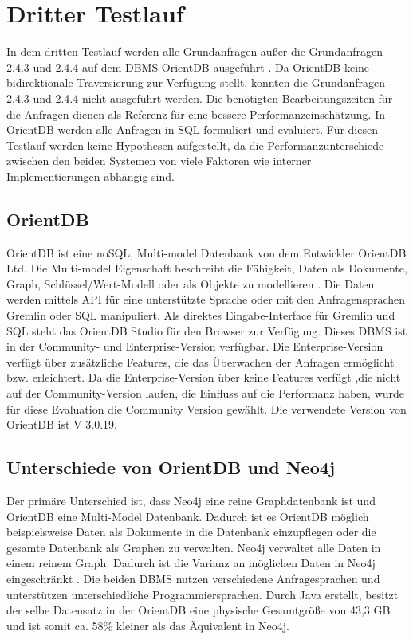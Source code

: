 \section{Dritter Testlauf}
In dem dritten Testlauf werden alle Grundanfragen außer die Grundanfragen 2.4.3 und 2.4.4 auf dem DBMS OrientDB ausgeführt \parencite{OrientDB}. Da OrientDB keine bidirektionale Traversierung zur Verfügung stellt, konnten die Grundanfragen 2.4.3 und 2.4.4 nicht ausgeführt werden. Die benötigten Bearbeitungszeiten für die Anfragen dienen als Referenz für eine bessere Performanzeinschätzung. In OrientDB werden alle Anfragen in SQL formuliert und evaluiert. Für diesen Testlauf werden keine Hypothesen aufgestellt, da die Performanzunterschiede zwischen den beiden Systemen von viele Faktoren wie interner Implementierungen abhängig sind. 
\subsection{OrientDB}
OrientDB ist eine noSQL,  Multi-model Datenbank von dem Entwickler OrientDB Ltd. Die Multi-model Eigenschaft beschreibt die Fähigkeit, Daten als Dokumente, Graph, Schlüssel/Wert-Modell oder als Objekte zu modellieren \parencite{OrientDB}. Die Daten werden mittels API für eine unterstützte Sprache oder mit den Anfragensprachen Gremlin oder SQL manipuliert. Als direktes Eingabe-Interface für Gremlin und SQL steht das OrientDB Studio für den Browser zur Verfügung.  Dieses DBMS ist in der Community- und Enterprise-Version verfügbar. Die Enterprise-Version verfügt über zusätzliche Features, die das Überwachen der Anfragen ermöglicht bzw. erleichtert. Da die Enterprise-Version über keine Features verfügt ,die nicht auf der Community-Version laufen, die Einfluss auf die  Performanz haben, wurde für diese Evaluation die Community Version gewählt. Die verwendete Version von OrientDB ist V 3.0.19. 
\subsection{Unterschiede von OrientDB und Neo4j}
Der primäre Unterschied ist, dass Neo4j eine reine Graphdatenbank ist und OrientDB eine Multi-Model Datenbank. Dadurch ist es OrientDB möglich beispielsweise Daten als Dokumente in die Datenbank einzupflegen oder die gesamte Datenbank als Graphen zu verwalten. Neo4j verwaltet alle Daten in einem reinem Graph. Dadurch ist  die Varianz an möglichen Daten in Neo4j eingeschränkt \parencite{fernandes2018graph}. Die beiden DBMS nutzen verschiedene Anfragesprachen und unterstützen unterschiedliche Programmiersprachen. Durch Java erstellt, besitzt der selbe Datensatz in der OrientDB eine physische Gesamtgröße von 43,3 GB und ist somit ca. 58\% kleiner als das Äquivalent in Neo4j.